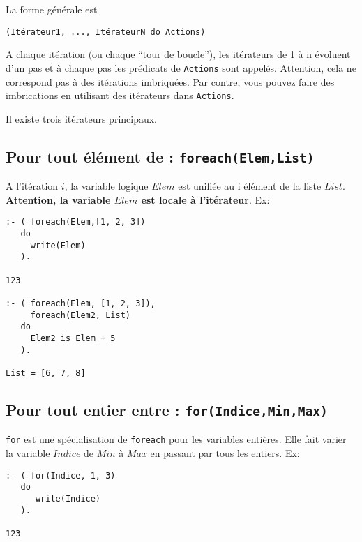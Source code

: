 La forme générale est
\begin{verbatim}
(Itérateur1, ..., ItérateurN do Actions)
\end{verbatim}
A chaque itération (ou chaque ``tour de boucle''), les itérateurs de 1
à n évoluent d'un pas et à chaque pas les prédicats de \verb|Actions|
sont appelés. Attention, cela ne correspond pas à des itérations
imbriquées. Par contre, vous pouvez faire des imbrications en
utilisant des itérateurs dans \verb|Actions|.

Il existe trois itérateurs principaux.

\subsection{Pour tout élément de : {\tt foreach(Elem,List)}}
  A l'itération $i$, la variable logique $Elem$ est unifiée au i
  élément de la liste $List$. \textbf{Attention, la variable $Elem$ est locale à l'itérateur}. Ex: 
\begin{verbatim}
:- ( foreach(Elem,[1, 2, 3]) 
   do 
     write(Elem)
   ).

123

:- ( foreach(Elem, [1, 2, 3]), 
     foreach(Elem2, List) 
   do 
     Elem2 is Elem + 5
   ). 

List = [6, 7, 8]
\end{verbatim}

 
\subsection{Pour tout entier entre : {\tt for(Indice,Min,Max)}}
  \verb!for! est une spécialisation de \verb!foreach! pour les variables
  entières. Elle fait varier la variable $Indice$ de $Min$ à $Max$ en passant par
  tous les entiers. Ex: 
\begin{verbatim}
:- ( for(Indice, 1, 3) 
   do 
      write(Indice)
   ).

123
\end{verbatim}

 
